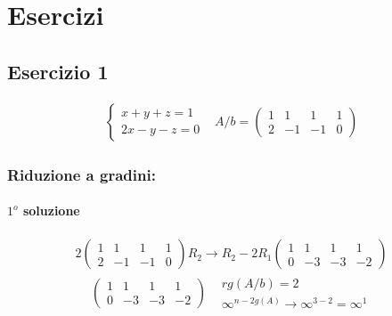 \chapter{Esercizi}
\label{chap:esercizi}

\section{Esercizio 1}
\label{sec:esercizio1}

\begin{eqnarray*}
  \begin{cases}
    x+y+z=1\\
    2x-y-z=0
  \end{cases} & A/b=
                \left(\begin{array}{ccc|l}
                  1&1&1 & 1 \\
                  2 & -1 & -1 &0
                \end{array}\right)
\end{eqnarray*}

\subsection{Riduzione a gradini:}
\label{sec:riduzioneagradini}

\subsubsection{$1^o$ soluzione}
\label{sec:soluzione1}

\begin{eqnarray*}
 2\left(
  \begin{array}{ccc|l}
    1&1&1 &1\\
    2 & -1 & -1 & 0
  \end{array}\right) R_2\to R_2-2R_1 \left(
  \begin{array}{ccc|l}
    1&1&1&1\\
    0 & -3 & -3&-2
  \end{array} \right)
\end{eqnarray*}
\begin{eqnarray*}
  \left(
  \begin{array}{ccc|l}
    1&1&1&1\\
    0 & -3 & -3&-2
  \end{array} \right) &
                        \begin{matrix}
                          rg(A/b)=2\\
                          \infty^{n-2g(A)} \to \infty^{3-2} = \infty^1
                        \end{matrix}
\end{eqnarray*}

